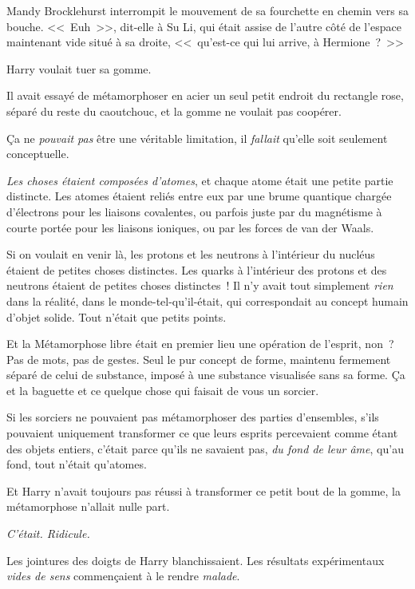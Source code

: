 \later

Mandy Brocklehurst interrompit le mouvement de sa fourchette en chemin vers sa bouche. <<~Euh~>>, dit-elle à Su Li, qui était assise de l'autre côté de l'espace maintenant vide situé à sa droite, <<~qu'est-ce qui lui arrive, à Hermione~?~>>

\later

Harry voulait tuer sa gomme.

Il avait essayé de métamorphoser en acier un seul petit endroit du rectangle rose, séparé du reste du caoutchouc, et la gomme ne voulait pas coopérer.

Ça ne \emph{pouvait pas} être une véritable limitation, il \emph{fallait} qu'elle soit seulement conceptuelle.

\emph{Les choses étaient composées d'atomes}, et chaque atome était une petite partie distincte. Les atomes étaient reliés entre eux par une brume quantique chargée d'électrons pour les liaisons covalentes, ou parfois juste par du magnétisme à courte portée pour les liaisons ioniques, ou par les forces de van der Waals.

Si on voulait en venir là, les protons et les neutrons à l'intérieur du nucléus étaient de petites choses distinctes. Les quarks à l'intérieur des protons et des neutrons étaient de petites choses distinctes~! Il n'y avait tout simplement \emph{rien} dans la réalité, dans le monde-tel-qu'il-était, qui correspondait au concept humain d'objet solide. Tout n'était que petits points.

Et la Métamorphose libre était en premier lieu une opération de l'esprit, non~? Pas de mots, pas de gestes. Seul le pur concept de forme, maintenu fermement séparé de celui de substance, imposé à une substance visualisée sans sa forme. Ça et la baguette et ce quelque chose qui faisait de vous un sorcier.

Si les sorciers ne pouvaient pas métamorphoser des parties d'ensembles, s'ils pouvaient uniquement transformer ce que leurs esprits percevaient comme étant des objets entiers, c'était parce qu'ils ne savaient pas, \emph{du fond de leur âme}, qu'au fond, tout n'était qu'atomes.

Et Harry n'avait toujours pas réussi à transformer ce petit bout de la gomme, la métamorphose n'allait nulle part.

\emph{C'était. Ridicule.}

Les jointures des doigts de Harry blanchissaient. Les résultats expérimentaux \emph{vides de sens} commençaient à le rendre \emph{malade}.

